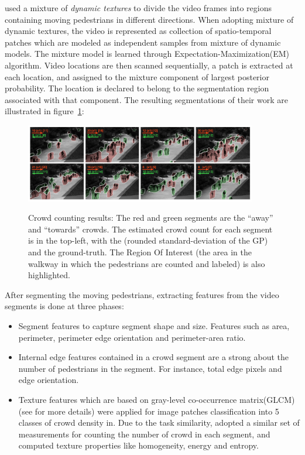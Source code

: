 \citeauthor*{chan2008privacy} used a mixture of \textit{dynamic textures}\cite{doretto2003dynamic, chan2008modeling} to divide the video frames into regions containing moving pedestrians in different directions. When adopting mixture of dynamic textures, the video is represented as collection of spatio-temporal patches which are modeled as independent samples from mixture of dynamic models\cite{doretto2003dynamic}. The mixture model is learned through Expectation-Maximization(EM) algorithm\cite{chan2008modeling}. Video locations are then scanned sequentially, a patch is extracted at each location, and assigned to the mixture component of largest posterior probability. The location is declared to belong to the segmentation region associated with that component\cite{chan2008privacy}. The resulting segmentations of their work are illustrated in figure~\ref{fig:segUcsd}:
\begin{figure}[H]
	\centering
	{\includegraphics[width=0.9\textwidth]{images/segUcsd}}
	\caption{Crowd counting results: The red and green segments are the “away” and “towards” crowds. The estimated crowd count for each segment is in the top-left, with the (rounded standard-deviation of the GP) and the ground-truth. The Region Of Interest (the area in the walkway in which the pedestrians are counted and labeled) is also highlighted\cite{chan2008privacy}.}
	\label{fig:segUcsd}
\end{figure}

After segmenting the moving pedestrians, extracting features from the video segments is done at three phases:
\begin{itemize}
	\item Segment features to capture segment shape and size. Features such as area, perimeter, perimeter edge orientation and perimeter-area ratio. 
	\item Internal edge features contained in a crowd segment are a strong about the number of pedestrians in the segment\cite{davies1995crowd, kong2005counting}. For instance, total edge pixels and edge orientation. 
	\item Texture features which are based on gray-level co-occurrence matrix(GLCM) (see \cite{haralick1973textural} for more details) were applied for image patches classification into 5 classes of crowd density in\cite{marana1998efficacy}. Due to the task similarity, \citeauthor*{chan2008privacy} adopted a similar set of measurements for counting the number of crowd in each segment, and computed texture properties like homogeneity, energy and entropy. 
\end{itemize} 

